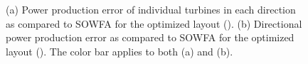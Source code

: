 \documentclass[conf]{new-aiaa}
\begin{document}
\begin{figure}[htpb!]
	\centering
	\caption{(a) Power production error of individual turbines in each direction as compared to SOWFA for the optimized layout (). (b) Directional power production error as compared to SOWFA for the optimized layout ().  The color bar applies to both (a) and (b).}
	\label{fig:optimized-power-error}
\end{figure}

\clearpage 



\end{document}
